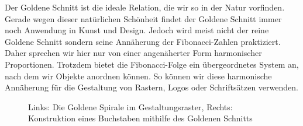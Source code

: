\documentclass[12pt,a4paper]{article}
\begin{document}

Der Goldene Schnitt ist die ideale Relation, die wir so in der Natur vorfinden. Gerade wegen dieser natürlichen Schönheit findet der Goldene Schnitt immer noch Anwendung in Kunst und Design. Jedoch wird meist nicht der reine Goldene Schnitt sondern seine Annäherung der Fibonacci-Zahlen praktiziert. Daher sprechen wir hier nur von einer angenäherter Form harmonischer Proportionen. Trotzdem bietet die Fibonacci-Folge ein übergeordnetes System an, nach dem wir Objekte anordnen können. So können wir diese harmonische Annäherung für die Gestaltung von Rastern, Logos oder Schriftsätzen verwenden.

\begin{figure}[htbp]
 \hfill
{}
\caption{Links: Die Goldene Spirale im Gestaltungsraster, Rechts: Konstruktion eines Buchstaben mithilfe des Goldenen Schnitts\protect\footnotemark[9]}
\end{figure}
\end{document}
